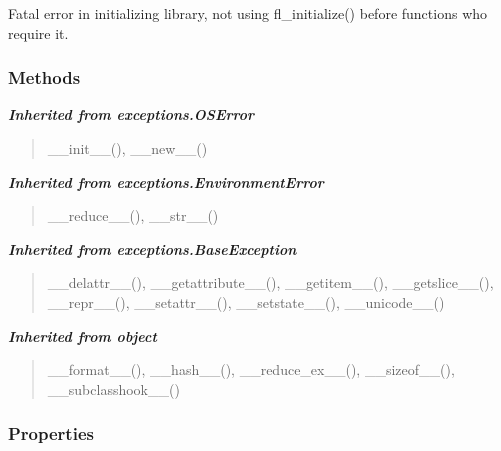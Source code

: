 Fatal error in initializing library, not using fl\_initialize()
before functions who require it.


  \subsubsection{Methods}


\large{\textbf{\textit{Inherited from exceptions.OSError}}}

\begin{quote}
\_\_init\_\_(), \_\_new\_\_()
\end{quote}

\large{\textbf{\textit{Inherited from exceptions.EnvironmentError}}}

\begin{quote}
\_\_reduce\_\_(), \_\_str\_\_()
\end{quote}

\large{\textbf{\textit{Inherited from exceptions.BaseException}}}

\begin{quote}
\_\_delattr\_\_(), \_\_getattribute\_\_(), \_\_getitem\_\_(), \_\_getslice\_\_(), \_\_repr\_\_(), \_\_setattr\_\_(), \_\_setstate\_\_(), \_\_unicode\_\_()
\end{quote}

\large{\textbf{\textit{Inherited from object}}}

\begin{quote}
\_\_format\_\_(), \_\_hash\_\_(), \_\_reduce\_ex\_\_(), \_\_sizeof\_\_(), \_\_subclasshook\_\_()
\end{quote}


  \subsubsection{Properties}

